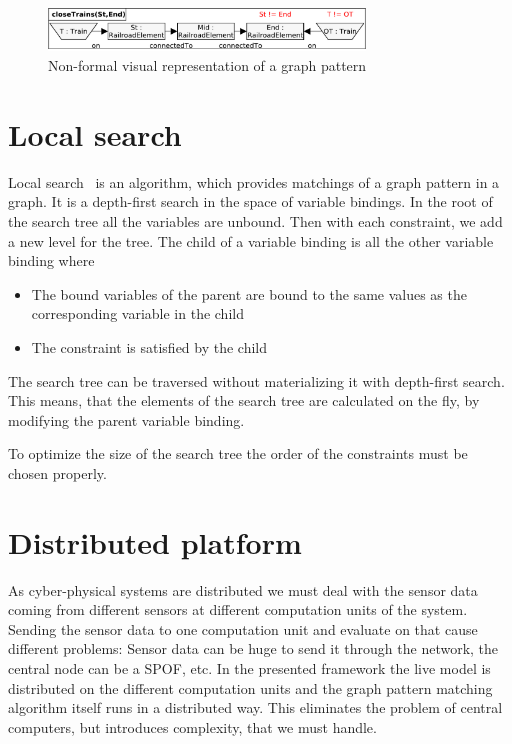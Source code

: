 \begin{figure}[h]
	\begin{center}
		\includegraphics[width=0.75\textwidth]{figures/pattern-visual.pdf}
		\caption{Non-formal visual representation of a graph pattern}
		\label{pattern-visual}
	\end{center}
\end{figure}


\section{Local search}

Local search~\cite{bur-marton-msc} is an algorithm, which provides matchings of a graph pattern in a graph. It is a depth-first search in the space of variable bindings. In the root of the search tree all the variables are unbound. Then with each constraint, we add a new level for the tree. The child of a variable binding is all the other variable binding where 
\begin{itemize}
	\item The bound variables of the parent are bound to the same values as the corresponding variable in the child
	\item The constraint is satisfied by the child
\end{itemize}

The search tree can be traversed without materializing it with depth-first search. This means, that the elements of the search tree are calculated on the fly, by modifying the parent variable binding.

To optimize the size of the search tree the order of the constraints must be chosen properly. 

\section{Distributed platform}


As cyber-physical systems are distributed we must deal with the sensor data coming from different sensors at different computation units of the system. Sending the sensor data to one computation unit and evaluate on that cause different problems: Sensor data can be huge to send it through the network, the central node can be a SPOF, etc. In the presented framework the live model is distributed on the different computation units and the graph pattern matching algorithm itself runs in a distributed way. This eliminates the problem of central computers, but introduces complexity, that we must handle. 








